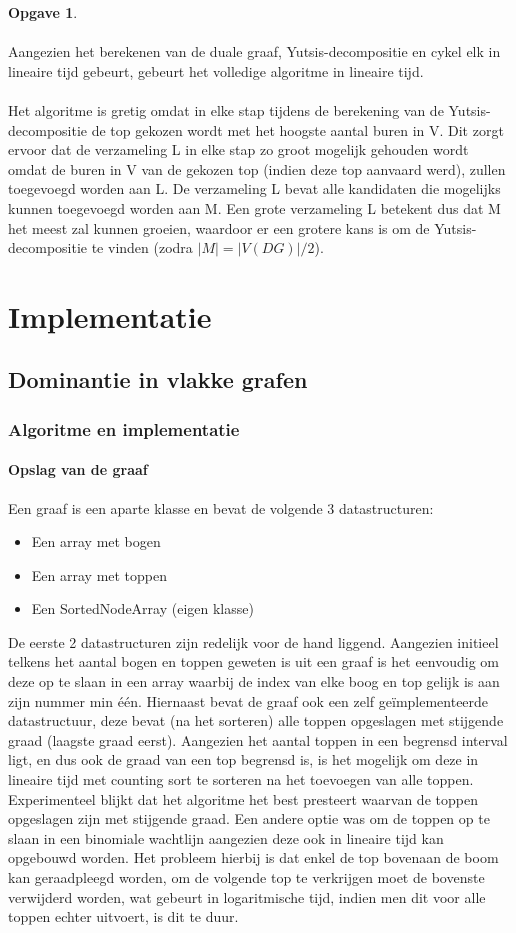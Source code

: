 \documentclass[11pt, a4paper, table]{article}
\theoremstyle{definition}
\newtheorem{opgave}{Opgave}
\theoremstyle{definition}
\theoremstyle{definition}
\begin{document}
\begin{opgave}
\\\\Aangezien het berekenen van de duale graaf, Yutsis-decompositie en cykel elk in lineaire tijd gebeurt, gebeurt het volledige algoritme in lineaire tijd. 
\\\\Het algoritme is gretig omdat in elke stap tijdens de berekening van de Yutsis-decompositie de top gekozen wordt met het hoogste aantal buren in V. Dit zorgt ervoor dat de verzameling L in elke stap zo groot mogelijk gehouden wordt omdat de buren in V van de gekozen top (indien deze top aanvaard werd), zullen toegevoegd worden aan L. De verzameling L bevat alle kandidaten die mogelijks kunnen toegevoegd worden aan M. Een grote verzameling L betekent dus dat M het meest zal kunnen groeien, waardoor er een grotere kans is om de Yutsis-decompositie te vinden (zodra $|M| = |V(DG)|/2$).
 
\end{opgave}
	\section{Implementatie}
\subsection{Dominantie in vlakke grafen}
\subsubsection{Algoritme en implementatie}
\paragraph{Opslag van de graaf}
Een graaf is een aparte klasse en bevat de volgende 3 datastructuren:
\begin{itemize}
	\item Een array met bogen
	\item Een array met toppen
	\item Een SortedNodeArray (eigen klasse)
\end{itemize}
De eerste 2 datastructuren zijn redelijk voor de hand liggend. Aangezien initieel telkens het aantal bogen en toppen geweten is uit een graaf is het eenvoudig om deze op te slaan in een array waarbij de index van elke boog en top gelijk is aan zijn nummer min \'{e}\'{e}n. Hiernaast bevat de graaf ook een zelf ge\"{i}mplementeerde datastructuur, deze bevat (na het sorteren) alle toppen opgeslagen met stijgende graad (laagste graad eerst). Aangezien het aantal toppen in een begrensd interval ligt, en dus ook de graad van een top begrensd is, is het mogelijk om deze in lineaire tijd met counting sort te sorteren na het toevoegen van alle toppen. Experimenteel blijkt dat het algoritme het best presteert waarvan de toppen opgeslagen zijn met stijgende graad. Een andere optie was om de toppen op te slaan in een binomiale wachtlijn aangezien deze ook in lineaire tijd kan opgebouwd worden. Het probleem hierbij is dat enkel de top bovenaan de boom kan geraadpleegd worden, om de volgende top te verkrijgen moet de bovenste verwijderd worden, wat gebeurt in logaritmische tijd, indien men dit voor alle toppen echter uitvoert, is dit te duur. 
\end{document}
